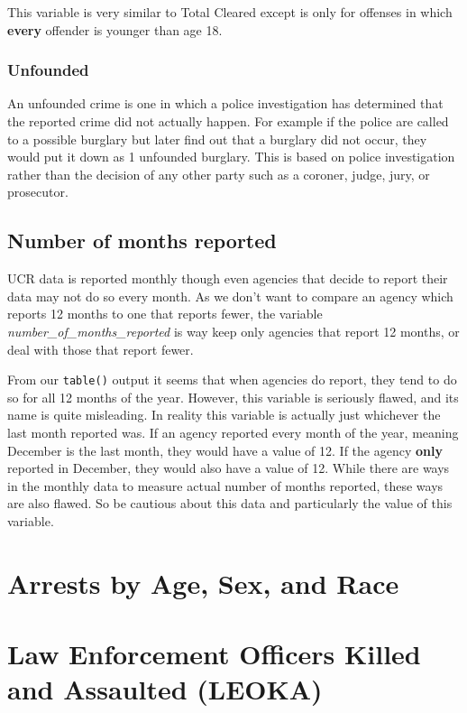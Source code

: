\documentclass[
  12pt,
]{book}
\begin{document}
This variable is very similar to Total Cleared except is only for offenses in which \textbf{every} offender is younger than age 18.

\hypertarget{unfounded}{%
\subsection{Unfounded}\label{unfounded}}

An unfounded crime is one in which a police investigation has determined that the reported crime did not actually happen. For example if the police are called to a possible burglary but later find out that a burglary did not occur, they would put it down as 1 unfounded burglary. This is based on police investigation rather than the decision of any other party such as a coroner, judge, jury, or prosecutor.

\hypertarget{number-of-months-reported}{%
\section{Number of months reported}\label{number-of-months-reported}}

UCR data is reported monthly though even agencies that decide to report their data may not do so every month. As we don't want to compare an agency which reports 12 months to one that reports fewer, the variable \emph{number\_of\_months\_reported} is way keep only agencies that report 12 months, or deal with those that report fewer.

From our \texttt{table()} output it seems that when agencies do report, they tend to do so for all 12 months of the year. However, this variable is seriously flawed, and its name is quite misleading. In reality this variable is actually just whichever the last month reported was. If an agency reported every month of the year, meaning December is the last month, they would have a value of 12. If the agency \textbf{only} reported in December, they would also have a value of 12. While there are ways in the monthly data to measure actual number of months reported, these ways are also flawed. So be cautious about this data and particularly the value of this variable.

\hypertarget{arrests}{%
\chapter{Arrests by Age, Sex, and Race}\label{arrests}}

\hypertarget{leoka}{%
\chapter{Law Enforcement Officers Killed and Assaulted (LEOKA)}\label{leoka}}
\end{document}
